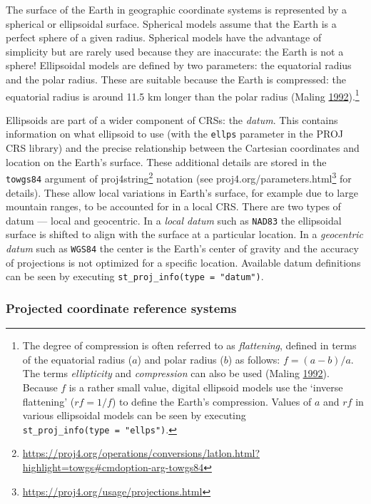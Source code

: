 \documentclass[]{krantz}
\let\rmarkdownfootnote\footnote%
\def\footnote{\protect\rmarkdownfootnote}
\renewcommand{\href}[2]{#2\footnote{\url{#1}}}
\begin{document}
The surface of the Earth in geographic coordinate systems is represented by a spherical or ellipsoidal surface.
Spherical models assume that the Earth is a perfect sphere of a given radius.
Spherical models have the advantage of simplicity but are rarely used because they are inaccurate: the Earth is not a sphere!
Ellipsoidal models are defined by two parameters: the equatorial radius and the polar radius.
These are suitable because the Earth is compressed: the equatorial radius is around 11.5 km longer than the polar radius (Maling \protect\hyperlink{ref-maling_coordinate_1992}{1992}).\footnote{The degree of compression is often referred to as \emph{flattening}, defined in terms of the equatorial radius (\(a\)) and polar radius (\(b\)) as follows: \(f = (a - b) / a\). The terms \emph{ellipticity} and \emph{compression} can also be used (Maling \protect\hyperlink{ref-maling_coordinate_1992}{1992}).
  Because \(f\) is a rather small value, digital ellipsoid models use the `inverse flattening' (\(rf = 1/f\)) to define the Earth's compression.
  Values of \(a\) and \(rf\) in various ellipsoidal models can be seen by executing \texttt{st\_proj\_info(type\ =\ "ellps")}.}

Ellipsoids are part of a wider component of CRSs: the \emph{datum}.
This contains information on what ellipsoid to use (with the \texttt{ellps} parameter in the PROJ CRS library) and the precise relationship between the Cartesian coordinates and location on the Earth's surface.
These additional details are stored in the \texttt{towgs84} argument of \href{https://proj4.org/operations/conversions/latlon.html?highlight=towgs\#cmdoption-arg-towgs84}{proj4string} notation (see \href{https://proj4.org/usage/projections.html}{proj4.org/parameters.html} for details).
These allow local variations in Earth's surface, for example due to large mountain ranges, to be accounted for in a local CRS.
There are two types of datum --- local and geocentric.
In a \emph{local datum} such as \texttt{NAD83} the ellipsoidal surface is shifted to align with the surface at a particular location.
In a \emph{geocentric datum} such as \texttt{WGS84} the center is the Earth's center of gravity and the accuracy of projections is not optimized for a specific location.
Available datum definitions can be seen by executing \texttt{st\_proj\_info(type\ =\ "datum")}.

\hypertarget{projected-coordinate-reference-systems}{%
\subsubsection{Projected coordinate reference systems}\label{projected-coordinate-reference-systems}}
\end{document}
